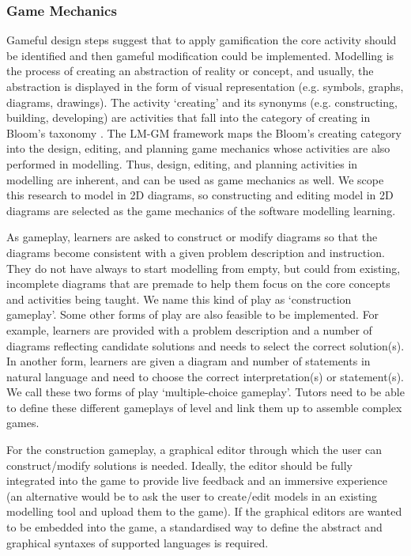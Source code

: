\documentclass[conference]{IEEEtran}
\begin{document}
\subsubsection{Game Mechanics} 
\label{Game Mechanics} 
Gameful design steps \cite{deterding2015lens} suggest that to apply gamification the core activity should be identified and then gameful modification could be implemented. Modelling is the process of creating an abstraction of reality or concept, and usually, the abstraction is displayed in the form of visual representation (e.g. symbols, graphs, diagrams, drawings). The activity `creating' and its synonyms (e.g. constructing, building, developing) are activities that fall into the category of creating in Bloom's taxonomy \cite{krathwohl2002revision}. The LM-GM framework \cite{arnab2015mapping} maps the Bloom's creating category into the design, editing, and planning game mechanics whose activities are also performed in modelling. Thus, design, editing, and planning activities in modelling are inherent, and can be used as game mechanics as well. We scope this research to model in 2D diagrams, so constructing and editing model in 2D diagrams are selected as the game mechanics of the software modelling learning.

As gameplay, learners are asked to construct or modify diagrams so that the diagrams become consistent with a given problem description and instruction. They do not have always to start modelling from empty, but could from existing, incomplete diagrams that are premade to help them focus on the core concepts and activities being taught\cite{deterding2015lens}. We name this kind of play as `construction gameplay'. Some other forms of play are also feasible to be implemented. For example, learners are provided with a problem description and a number of diagrams reflecting candidate solutions and needs to select the correct solution(s). In another form, learners are given a diagram and number of statements in natural language and need to choose the correct interpretation(s) or statement(s). We call these two forms of play `multiple-choice gameplay'. Tutors need to be able to define these different gameplays of level and link them up to assemble complex games. 

For the construction gameplay, a graphical editor through which the user can construct/modify solutions is needed. Ideally, the editor should be fully integrated into the game to provide live feedback and an immersive experience (an alternative would be to ask the user to create/edit models in an existing modelling tool and upload them to the game). If the graphical editors are wanted to be embedded into the game, a standardised way to define the abstract and graphical syntaxes of supported languages is required. 
\end{document}
